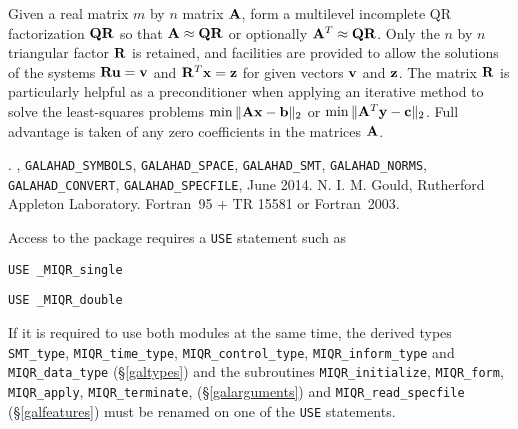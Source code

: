 \documentclass{galahad}
\newcommand{\packagename}{MIQR}
\newcommand{\fullpackagename}{\libraryname\_\packagename}
\begin{document}
\galheader


\galsummary
Given a real matrix $m$ by $n$ matrix ${\mathbf{A}}$, form a multilevel 
incomplete QR factorization ${\mathbf{Q}} {\mathbf{R}}$ so that ${\mathbf{A}} \approx {\mathbf{Q}}{\mathbf{R}}$ or
optionally ${\mathbf{A}}^T \approx {\mathbf{Q}}{\mathbf{R}}$.
Only the $n$ by $n$ triangular factor ${\mathbf{R}}$ is retained, and facilities
are provided to allow the solutions of the systems ${\mathbf{R}} {\mathbf{u}} = {\mathbf{v}}$ and 
${\mathbf{R}}^T {\mathbf{x}} = {\mathbf{z}}$
for given vectors ${\mathbf{v}}$ and ${\mathbf{z}}$. The matrix ${\mathbf{R}}$ is particularly helpful
as a preconditioner when applying an iterative method to solve the
least-squares problems $\min \|{\mathbf{A}}{\mathbf{x}}-{\mathbf{b}}\|_2$ or 
$\min \|{\mathbf{A}}^T{\mathbf{y}}-{\mathbf{c}}\|_2$.
Full advantage is taken of any zero coefficients in the matrices ${\mathbf{A}}$.


\galattributes
\galversions{\tt  \fullpackagename\_single, \fullpackagename\_double}.
,
{\tt GALAHAD\_\-SY\-M\-BOLS}, 
{\tt GALAHAD\-\_SPACE}, 
{\tt GALAHAD\_SMT},
{\tt GALAHAD\_NORMS},
{\tt GALAHAD\_CONVERT},
{\tt GALAHAD\_SPECFILE},
\galdate June 2014.
\galorigin N. I. M. Gould,
Rutherford Appleton Laboratory.
\gallanguage Fortran~95 + TR 15581 or Fortran~2003. 


\galhowto


Access to the package requires a {\tt USE} statement such as

\medskip{}

\hspace{8mm} {\tt USE \fullpackagename\_single}

\medskip{}

\hspace{8mm} {\tt USE  \fullpackagename\_double}

\medskip

\noindent
If it is required to use both modules at the same time, the derived types 
{\tt SMT\_type}, 
{\tt \packagename\_time\_type}, 
{\tt \packagename\_control\_type}, 
{\tt \packagename\_inform\_type} 
and
{\tt \packagename\_data\_type}
(\S\ref{galtypes})
and the subroutines
{\tt \packagename\_initialize}, 
{\tt \packagename\_\-form},
{\tt \packagename\_\-apply},
{\tt \packagename\_terminate},
(\S\ref{galarguments})
and 
{\tt \packagename\_read\_specfile}
(\S\ref{galfeatures})
must be renamed on one of the {\tt USE} statements.
\end{document}

